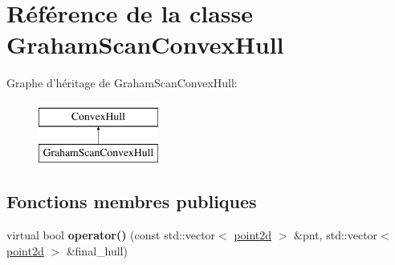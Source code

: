 \hypertarget{class_graham_scan_convex_hull}{\section{Référence de la classe Graham\-Scan\-Convex\-Hull}
\label{class_graham_scan_convex_hull}
}
Graphe d'héritage de Graham\-Scan\-Convex\-Hull\-:\begin{figure}[H]
\begin{center}
\leavevmode
\includegraphics[height=2.000000cm]{class_graham_scan_convex_hull}
\end{center}
\end{figure}
\subsection*{Fonctions membres publiques}
\begin{DoxyCompactItemize}
\item 
\hypertarget{class_graham_scan_convex_hull_ac37484a57554ed7fe1c52b0e39f32986}{virtual bool {\bfseries operator()} (const std\-::vector$<$ \hyperlink{structpoint2d}{point2d} $>$ \&pnt, std\-::vector$<$ \hyperlink{structpoint2d}{point2d} $>$ \&final\-\_\-hull)}\label{class_graham_scan_convex_hull_ac37484a57554ed7fe1c52b0e39f32986}

\end{DoxyCompactItemize}
